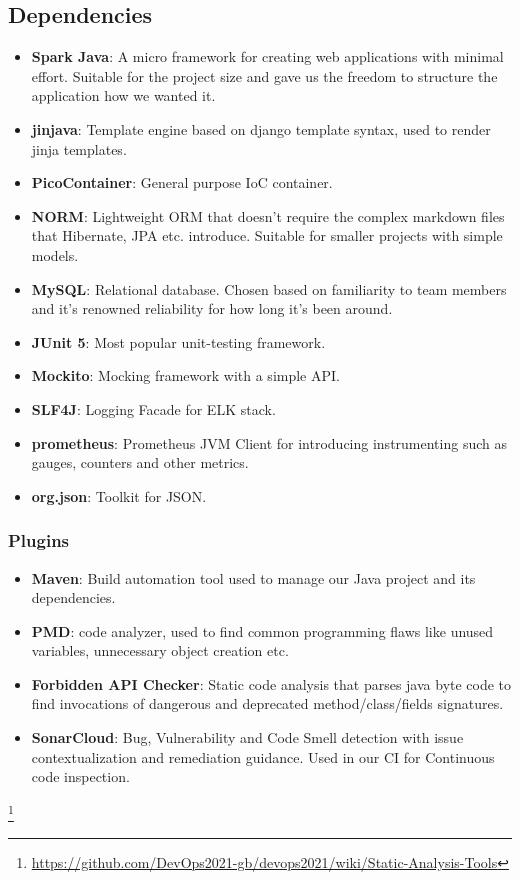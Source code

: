 \subsection{Dependencies } %
\begin{itemize}
    \item \textbf{Spark Java}: A micro framework for creating web applications with minimal effort. Suitable for the project size and gave us the freedom to structure the application how we wanted it.
    \item \textbf{jinjava}: Template engine based on django template syntax, used to render jinja templates.
    \item \textbf{PicoContainer}: General purpose IoC container.
    \item \textbf{NORM}: Lightweight ORM that doesn't require the complex markdown files that Hibernate, JPA etc. introduce. Suitable for smaller projects with simple models. 
    \item \textbf{MySQL}: Relational database. Chosen based on familiarity to team members and it's renowned reliability for how long it's been around.  
    \item \textbf{JUnit 5}: Most popular unit-testing framework.
    \item \textbf{Mockito}: Mocking framework with a simple API.
    \item \textbf{SLF4J}: Logging Facade for ELK stack. 
    \item \textbf{prometheus}: Prometheus JVM Client for introducing instrumenting such as gauges, counters and other metrics.
    \item \textbf{org.json}: Toolkit for JSON.
\end{itemize}
\subsubsection{Plugins}
\begin{itemize}
    \item \textbf{Maven}: Build automation tool used to manage our Java project and its dependencies.
    \item \textbf{PMD}: code analyzer, used to find common programming flaws like unused variables, unnecessary object creation etc. 
    \item \textbf{Forbidden API Checker}: Static code analysis that parses java byte code to find invocations of dangerous and deprecated method/class/fields signatures. 
    \item \textbf{SonarCloud}: Bug, Vulnerability and Code Smell detection with issue contextualization and remediation guidance. Used in our CI for Continuous code inspection.
\end{itemize}
\footnote{\url{https://github.com/DevOps2021-gb/devops2021/wiki/Static-Analysis-Tools}}


